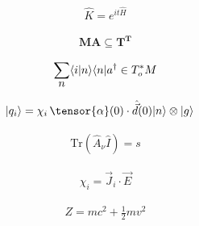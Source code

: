 \documentclass[twocolumn,pra,aps,superscriptaddress]{revtex4-1}
\newcommand{\bra}[1]{\langle{#1}|}
\newcommand{\ket}[1]{|{#1}\rangle}
\newcommand{\braket}[2]{\langle{#1}|{#2}\rangle}
\begin{document}
\begin{align}
\hat{K} = e^{i t \hat{H}}
\end{align}

\begin{align}
\mathbf{MA} \subseteq \mathbf{T}^{\mathbf{T}}
\end{align}

\begin{align}
\sum_{\mathlarger{n}} \braket{i}{n}\bra{n} a^{\dagger} \in T^*_o M
\end{align}

\begin{align} %
\ket{q_i} &= \chi_i \, \tensor{\alpha}(0) \cdot \hat{\vec{d}}(0) \ket{n} \otimes \ket{g}
\end{align}

\begin{align} %
\mathrm{Tr}\left(\hat{A}_\nu \hat{I} \right) = s
\end{align}

\begin{align} %
\chi_i = \vec{J}_{i} \cdot \vec{E}
\end{align}

\begin{align} %
Z = m c^2 + \frac{1}{2} m v^2
\end{align}
\end{document}
